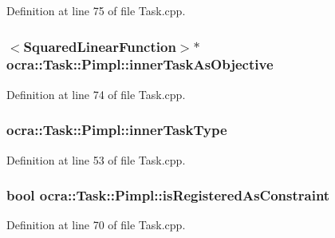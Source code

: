 Definition at line 75 of file Task.\+cpp.

\subsubsection[{\texorpdfstring{inner\+Task\+As\+Objective}{innerTaskAsObjective}}]{$<${\bf Squared\+Linear\+Function}$>$$\ast$ ocra\+::\+Task\+::\+Pimpl\+::inner\+Task\+As\+Objective}\hypertarget{structocra_1_1Task_1_1Pimpl_a8b5dfe1995ff26df2c0505195da5c305}{}\label{structocra_1_1Task_1_1Pimpl_a8b5dfe1995ff26df2c0505195da5c305}


Definition at line 74 of file Task.\+cpp.

\subsubsection[{\texorpdfstring{inner\+Task\+Type}{innerTaskType}}]{ ocra\+::\+Task\+::\+Pimpl\+::inner\+Task\+Type}\hypertarget{structocra_1_1Task_1_1Pimpl_a576a2ffd53c10013b395d3430fe487ed}{}\label{structocra_1_1Task_1_1Pimpl_a576a2ffd53c10013b395d3430fe487ed}


Definition at line 53 of file Task.\+cpp.

\subsubsection[{\texorpdfstring{is\+Registered\+As\+Constraint}{isRegisteredAsConstraint}}]{\setlength{\rightskip}{0pt plus 5cm}bool ocra\+::\+Task\+::\+Pimpl\+::is\+Registered\+As\+Constraint}\hypertarget{structocra_1_1Task_1_1Pimpl_ae028c89ba97335288e09cf823399f680}{}\label{structocra_1_1Task_1_1Pimpl_ae028c89ba97335288e09cf823399f680}


Definition at line 70 of file Task.\+cpp.

